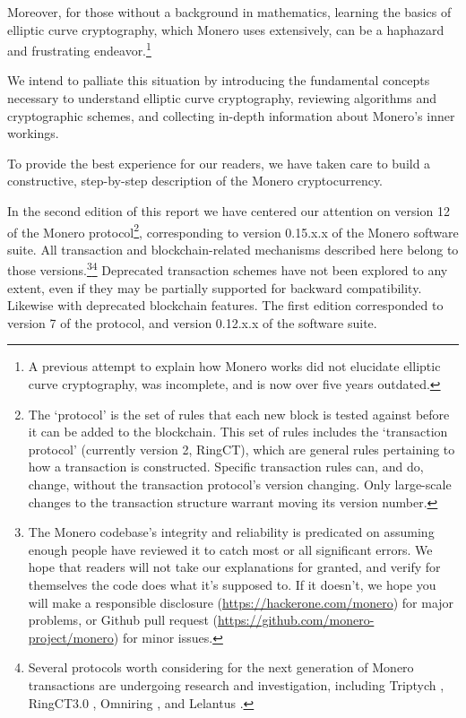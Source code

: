 Moreover, for those without a background in mathematics, learning the basics of elliptic curve cryptography, which Monero uses extensively, can be a haphazard and frustrating endeavor.\footnote{A previous attempt to explain how Monero works \cite{MRL-0003-about-monero} did not elucidate elliptic curve cryptography, was incomplete, and is now over five years outdated.}

We intend to palliate this situation by introducing the fundamental concepts necessary to understand elliptic curve cryptography, reviewing algorithms and cryptographic schemes, and collecting in-depth information about Monero’s inner workings.

To provide the best experience for our readers, we have taken care to build a constructive, step-by-step description of the Monero cryptocurrency.

In the second edition of this report we have centered our attention on version 12 of the Monero protocol\footnote{The `protocol' is the set of rules that each new block is tested against before it can be added to the blockchain. This set of rules includes the `transaction protocol' (currently version 2, RingCT), which are general rules pertaining to how a transaction is constructed. Specific transaction rules can, and do, change, without the transaction protocol's version changing. Only large-scale changes to the transaction structure warrant moving its version number.}, corresponding to version 0.15.x.x of the Monero software suite. All transaction and blockchain-related mechanisms described here belong to those versions.\footnote{The Monero codebase's integrity and reliability is predicated on assuming enough people have reviewed it to catch most or all significant errors. We hope that readers will not take our explanations for granted, and verify for themselves the code does what it's supposed to. If it doesn't, we hope you will make a responsible disclosure (\url{https://hackerone.com/monero}) for major problems, or Github pull request (\url{https://github.com/monero-project/monero}) for minor issues.}\footnote{Several protocols worth considering for the next generation of Monero transactions are undergoing research and investigation, including Triptych \cite{triptych-preprint}, RingCT3.0 \cite{ringct3-preprint}, Omniring \cite{omniring-paper}, and Lelantus \cite{lelantus-preprint}.} Deprecated transaction schemes have not been explored to any extent, even if they may be partially supported for backward compatibility. Likewise with deprecated blockchain features. The first edition \cite{ztm-1} corresponded to version 7 of the protocol, and version 0.12.x.x of the software suite.



